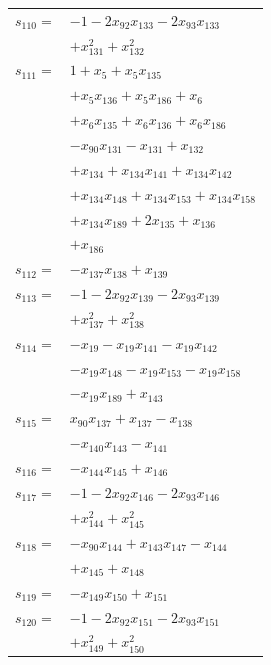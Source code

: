 \begin{longtable}{@{}r@{\;}l@{}}
\(s_{110}=\) & \(\displaystyle -1 -2x_{92}x_{133} -2x_{93}x_{133}\) \\
 & \(\displaystyle +x_{131}^{2} +x_{132}^{2}\) \\[3pt]
\(s_{111}=\) & \(\displaystyle 1 +x_{5} +x_{5}x_{135}\) \\
 & \(\displaystyle +x_{5}x_{136} +x_{5}x_{186} +x_{6}\) \\
 & \(\displaystyle +x_{6}x_{135} +x_{6}x_{136} +x_{6}x_{186}\) \\
 & \(\displaystyle -x_{90}x_{131} -x_{131} +x_{132}\) \\
 & \(\displaystyle +x_{134} +x_{134}x_{141} +x_{134}x_{142}\) \\
 & \(\displaystyle +x_{134}x_{148} +x_{134}x_{153} +x_{134}x_{158}\) \\
 & \(\displaystyle +x_{134}x_{189} +2x_{135} +x_{136}\) \\
 & \(\displaystyle +x_{186}\) \\[3pt]
\(s_{112}=\) & \(\displaystyle -x_{137}x_{138} +x_{139}\) \\[3pt]
\(s_{113}=\) & \(\displaystyle -1 -2x_{92}x_{139} -2x_{93}x_{139}\) \\
 & \(\displaystyle +x_{137}^{2} +x_{138}^{2}\) \\[3pt]
\(s_{114}=\) & \(\displaystyle -x_{19} -x_{19}x_{141} -x_{19}x_{142}\) \\
 & \(\displaystyle -x_{19}x_{148} -x_{19}x_{153} -x_{19}x_{158}\) \\
 & \(\displaystyle -x_{19}x_{189} +x_{143}\) \\[3pt]
\(s_{115}=\) & \(\displaystyle x_{90}x_{137} +x_{137} -x_{138}\) \\
 & \(\displaystyle -x_{140}x_{143} -x_{141}\) \\[3pt]
\(s_{116}=\) & \(\displaystyle -x_{144}x_{145} +x_{146}\) \\[3pt]
\(s_{117}=\) & \(\displaystyle -1 -2x_{92}x_{146} -2x_{93}x_{146}\) \\
 & \(\displaystyle +x_{144}^{2} +x_{145}^{2}\) \\[3pt]
\(s_{118}=\) & \(\displaystyle -x_{90}x_{144} +x_{143}x_{147} -x_{144}\) \\
 & \(\displaystyle +x_{145} +x_{148}\) \\[3pt]
\(s_{119}=\) & \(\displaystyle -x_{149}x_{150} +x_{151}\) \\[3pt]
\(s_{120}=\) & \(\displaystyle -1 -2x_{92}x_{151} -2x_{93}x_{151}\) \\
 & \(\displaystyle +x_{149}^{2} +x_{150}^{2}\) \\[3pt]

\end{longtable}

